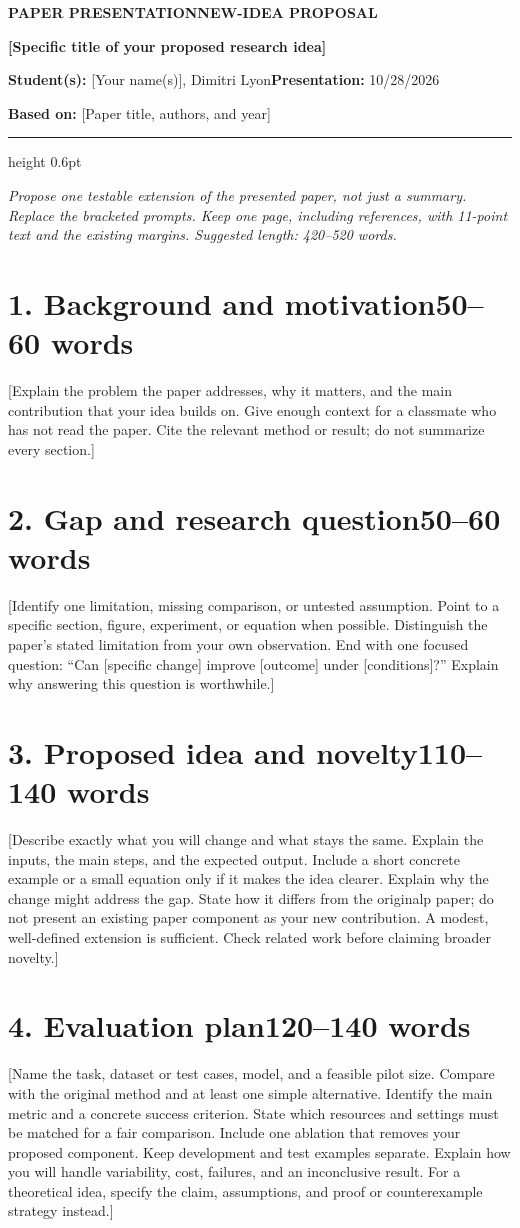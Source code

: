 \documentclass[11pt, letterpaper]{article}
\newcommand{\proposalheader}[4]{%
  {\small\sffamily\bfseries\color{ProposalBlue}
   PAPER PRESENTATION\enspace\textbullet\enspace NEW-IDEA PROPOSAL}\par
  \vspace{3pt}
  {\fontsize{16}{18}\selectfont\bfseries #1\par}
  \vspace{4pt}
  \textbf{Student(s):} #2\hfill\textbf{Presentation:} #3\par
  \textbf{Based on:} #4\par
  \vspace{3pt}
  {\color{ProposalBlue}\hrule height 0.6pt}
  \vspace{4pt}
}
\newcommand{\guide}[1]{{\color{SecondaryText}#1}}
\newcommand{\wordbudget}[1]{{\normalfont\small\color{SecondaryText}\hfill #1 words}}
\begin{document}
\proposalheader{[Specific title of your proposed research idea]}
  {[Your name(s)], Dimitri Lyon}{10/28/2026}
  {[Paper title, authors, and year]}

\guide{\textit{Propose one testable extension of the presented paper, not just a summary.
Replace the bracketed prompts. Keep one page, including references, with 11-point text
and the existing margins. Suggested length: 420--520 words.}}

\section*{1. Background and motivation\wordbudget{50--60}}
[Explain the problem the paper addresses, why it matters, and the main contribution
that your idea builds on. Give enough context for a classmate who has not read the
paper. Cite the relevant method or result; do not summarize every section.]

\section*{2. Gap and research question\wordbudget{50--60}}
[Identify one limitation, missing comparison, or untested assumption. Point to a
specific section, figure, experiment, or equation when possible. Distinguish the
paper's stated limitation from your own observation. End with one focused question:
``Can [specific change] improve [outcome] under [conditions]?'' Explain why answering
this question is worthwhile.]

\section*{3. Proposed idea and novelty\wordbudget{110--140}}

[Describe exactly what you will change and what stays the same. Explain the inputs,
the main steps, and the expected output. Include a short concrete example or a small
equation only if it makes the idea clearer. Explain why the change might address the
gap. State how it differs from the originalp paper; do not present an existing paper
component as your new contribution. A modest, well-defined extension is sufficient.
Check related work before claiming broader novelty.]

\section*{4. Evaluation plan\wordbudget{120--140}}
[Name the task, dataset or test cases, model, and a feasible pilot size. Compare with
the original method and at least one simple alternative. Identify the main metric
and a concrete success criterion. State which resources and settings must be matched
for a fair comparison. Include one ablation that removes your proposed component.
Keep development and test examples separate. Explain how you will handle variability,
cost, failures, and an inconclusive result. For a theoretical idea, specify the claim,
assumptions, and proof or counterexample strategy instead.]
\end{document}
